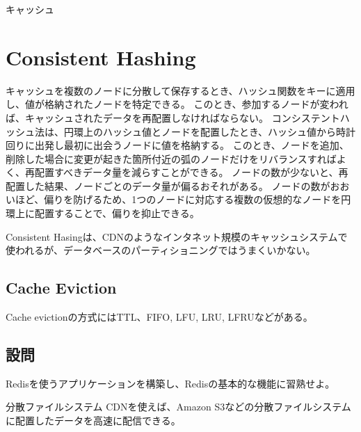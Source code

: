 \documentclass[book]{jlreq}
\begin{document}
\begin{chapter-bib}{キャッシュ}
  \section{Consistent Hashing}
  キャッシュを複数のノードに分散して保存するとき、ハッシュ関数をキーに適用し、値が格納されたノードを特定できる。
  このとき、参加するノードが変われば、キャッシュされたデータを再配置しなければならない。
  コンシステントハッシュ法は、円環上のハッシュ値とノードを配置したとき、ハッシュ値から時計回りに出発し最初に出会うノードに値を格納する\cite{sdi}。
  このとき、ノードを追加、削除した場合に変更が起きた箇所付近の弧のノードだけをリバランスすればよく、再配置すべきデータ量を減らすことができる。
  ノードの数が少ないと、再配置した結果、ノードごとのデータ量が偏るおそれがある。
  ノードの数がおおいほど、偏りを防げるため、1つのノードに対応する複数の仮想的なノードを円環上に配置することで、偏りを抑止できる。
  
  Consistent Hasingは、CDNのようなインタネット規模のキャッシュシステムで使われるが、データベースのパーティショニングではうまくいかない\cite{DBLP:journals/corr/LampingV14}。
  \subsection{Cache Eviction}
  Cache evictionの方式にはTTL、FIFO, LFU, LRU, LFRUなどがある\cite{lc-cache}。
  \subsection{設問}
  \begin{exercise}
  \item Redisを使うアプリケーションを構築し、Redisの基本的な機能に習熟せよ。
  \end{exercise}
\end{chapter-bib}
\begin{chapter-bib}{分散ファイルシステム}
  CDNを使えば、Amazon S3などの分散ファイルシステムに配置したデータを高速に配信できる\cite{lc-databases}。
\end{chapter-bib}
\end{document}
